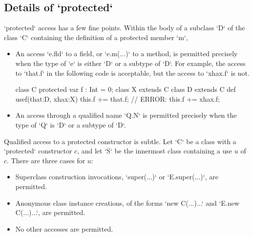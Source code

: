 \subsection{Details of \xcd`protected`}
\label{sect:protected-details}

\xcd`protected` access has a few fine points. 
Within the body of a subclass \xcd`D` of the class \xcd`C` containing
the definition of a protected member \xcd`m`, 

\begin{itemize}

\item An access \xcd`e.fld` to a field, or \xcd`e.m(...)` to a method, is
      permitted precisely when the type of \xcd`e` is either \xcd`D` or a
      subtype of \xcd`D`.  
For example, the access to \xcd`that.f` in the following code is acceptable, but
the access to \xcd`xhax.f` is not.  
\begin{xten}
class C {
  protected var f : Int = 0;
}
class X extends C {}
class D extends C {
  def usef(that:D, xhax:X) {
     this.f += that.f; 
     // ERROR: this.f += xhax.f;
  }
}
\end{xten}
%


\item An access through a qualified name \xcd`Q.N` is permitted precisely when
      the type of \xcd`Q` is \xcd`D` or a subtype of \xcd`D`. 

\end{itemize}

Qualified access to a protected constructor is subtle.  Let \xcd`C` be a class
with a \xcd`protected` constructor $c$, and let \xcd`S` be the innermost
class containing a use $u$ of $c$.  There are three cases for $u$: 

\begin{itemize}
\item Superclass construction invocations, \xcd`super(...)` or
      \xcd`E.super(...)`, are permitted.
\item Anonymous class instance creations, of the forms  \xcd`new C(...){...}`
      and \xcd`E.new C(...){...}`, are
      permitted.
\item No other accesses are permitted. 
\end{itemize}

